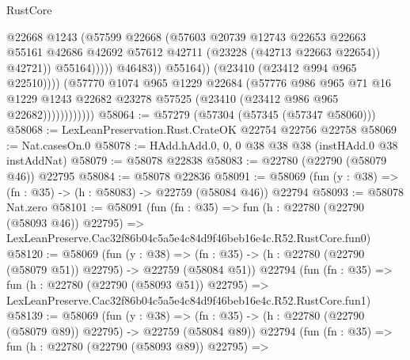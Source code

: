 \begin{lexlean}{RustCore}
\begin{coremodule}
                                          @22668
                                          @1243
                                          (@57599
                                            @22668
                                            (@57603
                                              @20739
                                              @12743
                                              @22653
                                              @22663
                                              @55161
                                              @42686
                                              @42692
                                              @57612
                                              @42711
                                              (@23228 (@42713 @22663 @22654))
                                              @42721))
                                          @55164)))))
                                @46483))
                            @55164))
                        (@23410 (@23412 @994 @965 @22510))))
                    (@57770
                      @1074
                      @965
                      @1229
                      @22684
                      (@57776
                        @986
                        @965
                        @71
                        @16
                        @1229
                        @1243
                        @22682
                        @23278
                        @57525
                        (@23410 (@23412 @986 @965 @22682))))))))))))
@58064 := @57279 (@57304 (@57345 (@57347 @58060)))
@58068 := LexLeanPreservation.Rust.CrateOK @22754 @22756 @22758
@58069 := Nat.casesOn.{0}
@58078 := HAdd.hAdd.{0, 0, 0} @38 @38 @38 (instHAdd.{0} @38 instAddNat)
@58079 := @58078 @22838
@58083 := @22780 (@22790 (@58079 @46)) @22795
@58084 := @58078 @22836
@58091 := @58069 (fun (y : @38) => (fn : @35) -> (h : @58083) -> @22759 (@58084 @46)) @22794
@58093 := @58078 Nat.zero
@58101 := @58091
    (fun (fn : @35) =>
    fun (h : @22780 (@22790 (@58093 @46)) @22795) =>
    LexLeanPreserve.Cac32f86b04c5a5e4c84d9f46beb16e4c.R52.RustCore.fun0)
@58120 := @58069
    (fun (y : @38) =>
    (fn : @35) -> (h : @22780 (@22790 (@58079 @51)) @22795) -> @22759 (@58084 @51))
    @22794
    (fun (fn : @35) =>
    fun (h : @22780 (@22790 (@58093 @51)) @22795) =>
    LexLeanPreserve.Cac32f86b04c5a5e4c84d9f46beb16e4c.R52.RustCore.fun1)
@58139 := @58069
    (fun (y : @38) =>
    (fn : @35) -> (h : @22780 (@22790 (@58079 @89)) @22795) -> @22759 (@58084 @89))
    @22794
    (fun (fn : @35) =>
    fun (h : @22780 (@22790 (@58093 @89)) @22795) =>

\end{coremodule}
\end{lexlean}
